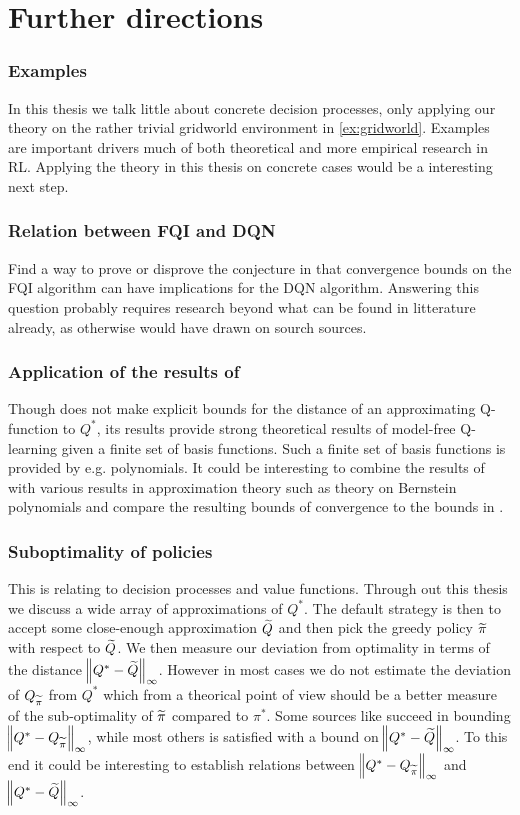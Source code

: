 \section{Further directions}
\subsubsection{Examples}
In this thesis we talk little about concrete decision processes, only
applying our theory on the rather trivial gridworld environment in
\cref{ex:gridworld}.
Examples are important drivers much of both theoretical and more empirical
research in RL.
Applying the theory in this thesis on concrete cases would be a interesting
next step.

\subsubsection{Relation between FQI and DQN}
Find a way to prove or disprove the conjecture in  that
convergence bounds on the FQI algorithm can have implications for the 
DQN algorithm.
Answering this question probably requires research beyond what can be
found in litterature already, as otherwise  would have
drawn on sourch sources.

\subsubsection{Application of the results of }
Though  does not make explicit bounds for the distance of an approximating
Q-function to $Q^*$,
its results provide strong theoretical results
of model-free Q-learning given a finite set of basis functions. 
Such a finite set of basis functions is provided by e.g.
polynomials. It could be interesting to combine the results of 
with various results in approximation theory such as theory on Bernstein
polynomials and compare the resulting bounds of convergence to the bounds in
.

\subsubsection{Suboptimality of policies}
This is relating to decision processes and value functions.
Through out this thesis we discuss a wide array of
approximations of $Q^*$.
The default strategy is then to accept some close-enough approximation $\widetilde{Q}$
and then pick the greedy policy $\widetilde{\pi}$ with respect to $\widetilde{Q}$.
We then measure our deviation from optimality in terms of the distance
$\norm{Q^* - \widetilde{Q}}_\infty$.
However in most cases we do not estimate the deviation of
$Q_{\widetilde{\pi}}$ from $Q^*$ which from a theorical point of view should be
a better measure of the sub-optimality of $\widetilde{\pi}$ compared to $\pi^*$.
Some sources like  succeed in bounding
$\norm{Q^* - Q_{\widetilde{\pi}}}_\infty$,
while most others is satisfied with a bound on $\norm{Q^* - \widetilde{Q}}_\infty$.
To this end it could be interesting to establish relations
between $\norm{Q^* - Q_{\widetilde{\pi}}}_\infty$ and $\norm{Q^* - \widetilde{Q}}_\infty$.

